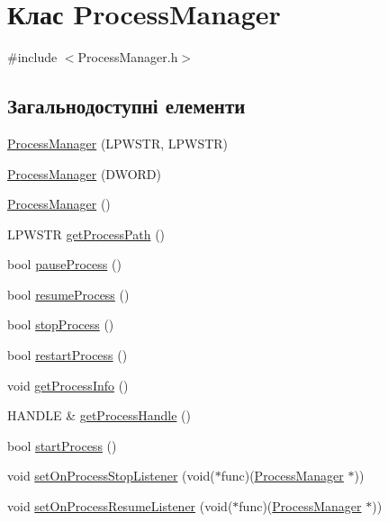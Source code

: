 \hypertarget{class_process_manager}{\section{Клас Process\+Manager}
\label{class_process_manager}
}


{\ttfamily \#include $<$Process\+Manager.\+h$>$}

\subsection*{Загальнодоступні елементи}
\begin{DoxyCompactItemize}
\item 
\hyperlink{class_process_manager_aeb235e3509127e76fbc1f9c525603120}{Process\+Manager} (L\+P\+W\+S\+T\+R, L\+P\+W\+S\+T\+R)
\item 
\hyperlink{class_process_manager_a37ddbc730a38922c9b7a0dafb0b7ab55}{Process\+Manager} (D\+W\+O\+R\+D)
\item 
\hyperlink{class_process_manager_a41b83a8ef0a801ca3aee9a3d82568ac1}{Process\+Manager} ()
\item 
L\+P\+W\+S\+T\+R \hyperlink{class_process_manager_a8c5aa33cb2a82c784ff2fcef6d44b9c0}{get\+Process\+Path} ()
\item 
bool \hyperlink{class_process_manager_a271267c549451c89be3a85948f6220d2}{pause\+Process} ()
\item 
bool \hyperlink{class_process_manager_a397a4518985e698014f1177c49456627}{resume\+Process} ()
\item 
bool \hyperlink{class_process_manager_a98a33242eded5ec7098c58ca5382d0a8}{stop\+Process} ()
\item 
bool \hyperlink{class_process_manager_a2c3cb2ec54bbec48d5ec6cea66b3eef6}{restart\+Process} ()
\item 
void \hyperlink{class_process_manager_a44dcace533e34ae32b1b87f869027b69}{get\+Process\+Info} ()
\item 
H\+A\+N\+D\+L\+E \& \hyperlink{class_process_manager_a9ef3daadbc5c9fbadf2b27959fa6ad48}{get\+Process\+Handle} ()
\item 
bool \hyperlink{class_process_manager_a2b7cdddccd6e70b341075f2f69422948}{start\+Process} ()
\item 
void \hyperlink{class_process_manager_a14bf654b6b333cf41b632c49d9a8efef}{set\+On\+Process\+Stop\+Listener} (void($\ast$func)(\hyperlink{class_process_manager}{Process\+Manager} $\ast$))
\item 
void \hyperlink{class_process_manager_a719434f2fe5c003f355b712dcddad850}{set\+On\+Process\+Resume\+Listener} (void($\ast$func)(\hyperlink{class_process_manager}{Process\+Manager} $\ast$))

\end{DoxyCompactItemize}
